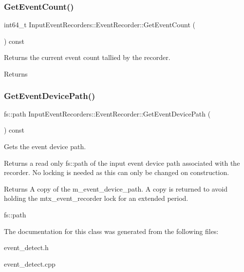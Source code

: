 \subsubsection{\texorpdfstring{Get\+Event\+Count()}{GetEventCount()}}
{\footnotesize\ttfamily int64\+\_\+t Input\+Event\+Recorders\+::\+Event\+Recorder\+::\+Get\+Event\+Count (\begin{DoxyParamCaption}{ }\end{DoxyParamCaption}) const}



Returns the current event count tallied by the recorder. 

\begin{DoxyReturn}{Returns}

\end{DoxyReturn}
\mbox{\label{classEventDetect_1_1InputEventRecorders_1_1EventRecorder_a70c83db169bbe5172bb170ac5b22b70b}} 
\subsubsection{\texorpdfstring{Get\+Event\+Device\+Path()}{GetEventDevicePath()}}
{\footnotesize\ttfamily fs\+::path Input\+Event\+Recorders\+::\+Event\+Recorder\+::\+Get\+Event\+Device\+Path (\begin{DoxyParamCaption}{ }\end{DoxyParamCaption}) const}



Gets the event device path. 

Returns a read only fs\+::path of the input event device path associated with the recorder. No locking is needed as this can only be changed on construction.

\begin{DoxyReturn}{Returns}
A copy of the m\+\_\+event\+\_\+device\+\_\+path. A copy is returned to avoid holding the mtx\+\_\+event\+\_\+recorder lock for an extended period.

fs\+::path 
\end{DoxyReturn}


The documentation for this class was generated from the following files\+:\begin{DoxyCompactItemize}
\item 
event\+\_\+detect.\+h\item 
event\+\_\+detect.\+cpp\end{DoxyCompactItemize}
